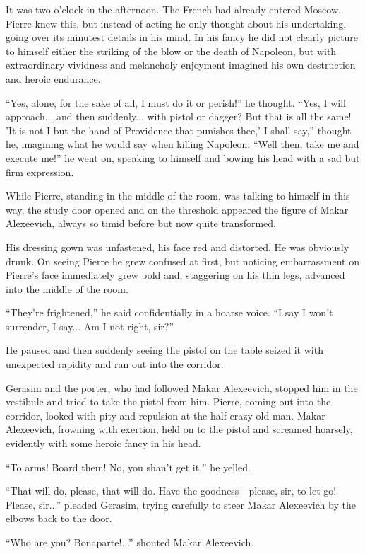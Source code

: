 It was two o'clock in the afternoon. The French had already
entered Moscow. Pierre knew this, but instead of acting he only
thought about his undertaking, going over its minutest details in
his mind. In his fancy he did not clearly picture to himself
either the striking of the blow or the death of Napoleon, but
with extraordinary vividness and melancholy enjoyment imagined
his own destruction and heroic endurance.

``Yes, alone, for the sake of all, I must do it or perish!'' he
thought.  ``Yes, I will approach... and then suddenly... with
pistol or dagger? But that is all the same! 'It is not I but the
hand of Providence that punishes thee,' I shall say,'' thought
he, imagining what he would say when killing Napoleon. ``Well
then, take me and execute me!'' he went on, speaking to himself
and bowing his head with a sad but firm expression.

While Pierre, standing in the middle of the room, was talking to
himself in this way, the study door opened and on the threshold
appeared the figure of Makar Alexeevich, always so timid before
but now quite transformed.

His dressing gown was unfastened, his face red and distorted. He
was obviously drunk. On seeing Pierre he grew confused at first,
but noticing embarrassment on Pierre's face immediately grew bold
and, staggering on his thin legs, advanced into the middle of the
room.

``They're frightened,'' he said confidentially in a hoarse
voice. ``I say I won't surrender, I say... Am I not right, sir?''

He paused and then suddenly seeing the pistol on the table seized
it with unexpected rapidity and ran out into the corridor.

Gerasim and the porter, who had followed Makar Alexeevich,
stopped him in the vestibule and tried to take the pistol from
him. Pierre, coming out into the corridor, looked with pity and
repulsion at the half-crazy old man. Makar Alexeevich, frowning
with exertion, held on to the pistol and screamed hoarsely,
evidently with some heroic fancy in his head.

``To arms! Board them! No, you shan't get it,'' he yelled.

``That will do, please, that will do. Have the goodness---please,
sir, to let go! Please, sir...'' pleaded Gerasim, trying
carefully to steer Makar Alexeevich by the elbows back to the
door.

``Who are you? Bonaparte!...'' shouted Makar Alexeevich.

